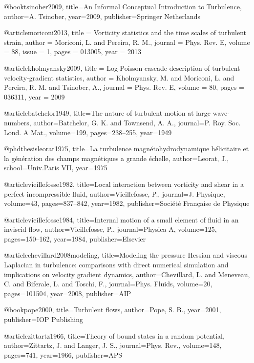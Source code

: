 @book{tsinober2009,
  title={An Informal Conceptual Introduction to Turbulence},
  author={A. Tsinober},
  year={2009},
  publisher={Springer Netherlands}
}

@article{moriconi2013,
  title = {Vorticity statistics and the time scales of turbulent strain},
  author = {Moriconi, L.  and Pereira, R. M.},
  journal = {Phys. Rev. E},
  volume = {88},
  issue = {1},
  pages = {013005},
  year = {2013}
  }

@article{kholmyansky2009,
  title = {Log-Poisson cascade description of turbulent velocity-gradient statistics},
  author = {Kholmyansky, M. and Moriconi, L. and Pereira, R. M. and Tsinober, A.},
  journal = {Phys. Rev. E},
  volume = {80},
  pages = {036311},
  year = {2009}
}

@article{batchelor1949,
  title={The nature of turbulent motion at large wave-numbers},
  author={Batchelor, G. K. and Townsend, A. A.},
  journal={P. Roy. Soc. Lond. A Mat.},
  volume={199},
  pages={238--255},
  year={1949}
}

@phdthesis{leorat1975,
  title={La turbulence magn{\'e}tohydrodynamique h{\'e}licitaire et la g{\'e}n{\'e}ration des champs magn{\'e}tiques a grande {\'e}chelle},
  author={Leorat, J.},
  school={Univ.Paris VII},
  year={1975}
}

@article{vieillefosse1982,
  title={Local interaction between vorticity and shear in a perfect incompressible fluid},
  author={Vieillefosse, P.},
  journal={J. Physique},
  volume={43},
  pages={837--842},
  year={1982},
  publisher={Soci{\'e}t{\'e} Fran{\c{c}}aise de Physique}
}

@article{vieillefosse1984,
  title={Internal motion of a small element of fluid in an inviscid flow},
  author={Vieillefosse, P.},
  journal={Physica A},
  volume={125},
  pages={150--162},
  year={1984},
  publisher={Elsevier}
}

@article{chevillard2008modeling,
  title={Modeling the pressure Hessian and viscous Laplacian in turbulence: comparisons with direct numerical simulation and implications on velocity gradient dynamics},
  author={Chevillard, L. and Meneveau, C. and Biferale, L. and Toschi, F.},
  journal={Phys. Fluids},
  volume={20},
  pages={101504},
  year={2008},
  publisher={AIP}
}

@book{pope2000,
  title={Turbulent flows},
  author={Pope, S. B.},
  year={2001},
  publisher={IOP Publishing}
}


@article{zittartz1966,
  title={Theory of bound states in a random potential},
  author={Zittartz, J. and Langer, J. S.},
  journal={Phys. Rev.},
  volume={148},
  pages={741},
  year={1966},
  publisher={APS}
}

